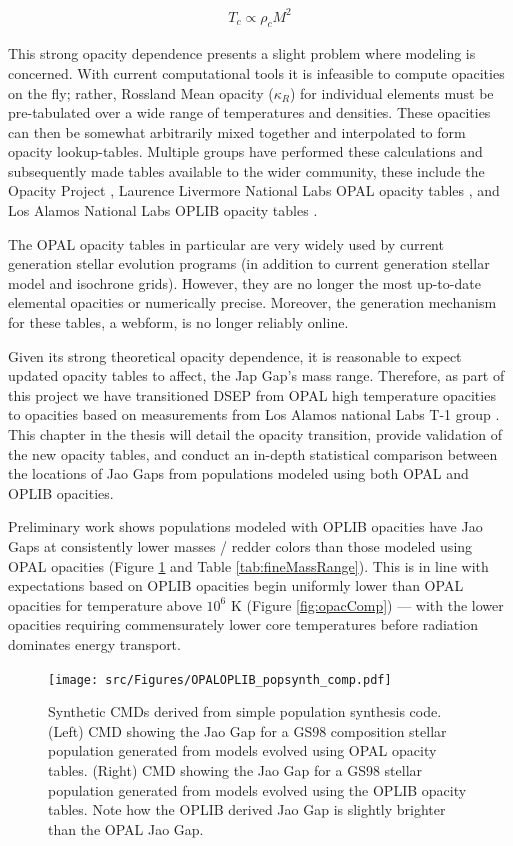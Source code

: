 \begin{align}\label{eqn:TMRelation}
	T_{c} \propto \rho_{c}M^{2}
\end{align}

This strong opacity dependence presents a slight problem where modeling is 
concerned. With current computational tools it is infeasible to compute opacities on the
fly; rather, Rossland Mean opacity ($\kappa_{R}$) for individual elements must
be pre-tabulated over a wide range of temperatures and densities. These
opacities can then be somewhat arbitrarily mixed together and interpolated to
form opacity lookup-tables. Multiple groups have performed these calculations
and subsequently made tables available to the wider community, these include
the Opacity Project \citep[OP][]{Seaton1994}, Laurence Livermore National Labs
OPAL opacity tables \citep{Iglesias1996}, and Los Alamos National Labs OPLIB
opacity tables \citep{Colgan2016}.

The OPAL opacity tables in particular are very widely used by current
generation stellar evolution programs (in addition to current generation
stellar model and isochrone grids). However, they are no longer the most
up-to-date elemental opacities or numerically precise. Moreover, the generation
mechanism for these tables, a webform, is no longer reliably online.  

Given its strong theoretical opacity dependence, it is reasonable to expect
updated opacity tables to affect, the Jap Gap's mass range. Therefore, as part
of this project we have transitioned DSEP from OPAL high temperature opacities
to opacities based on measurements from Los Alamos national Labs T-1 group
\citep[OPLIB][]{Colgan2016}. This chapter in the thesis will detail the opacity
transition, provide validation of the new opacity tables, and conduct an
in-depth statistical comparison between the locations of Jao Gaps from
populations modeled using both OPAL and OPLIB opacities.

Preliminary work shows populations modeled with OPLIB opacities have Jao Gaps
at consistently lower masses / redder colors than those modeled using OPAL
opacities (Figure \ref{fig:JaoGapOPALOPLIB} and Table \ref{tab:fineMassRange}).
This is in line with expectations based on OPLIB opacities begin uniformly
lower than OPAL opacities for temperature above $10^{6}$ K (Figure
\ref{fig:opacComp}) --- with the lower opacities requiring commensurately lower
core temperatures before radiation dominates energy transport. 

\begin{figure}
	\centering
	\texttt{[image: src/Figures/OPALOPLIB\_popsynth\_comp.pdf]}
	\caption{Synthetic CMDs derived from simple population synthesis code.
	(Left) CMD showing the Jao Gap for a GS98 composition stellar population
	generated from models evolved using OPAL opacity tables. (Right) CMD showing
	the Jao Gap for a GS98 stellar population generated from models evolved
	using the OPLIB opacity tables. Note how the OPLIB derived Jao Gap is
	slightly brighter than the OPAL Jao Gap.}
	\label{fig:JaoGapOPALOPLIB}
\end{figure}

